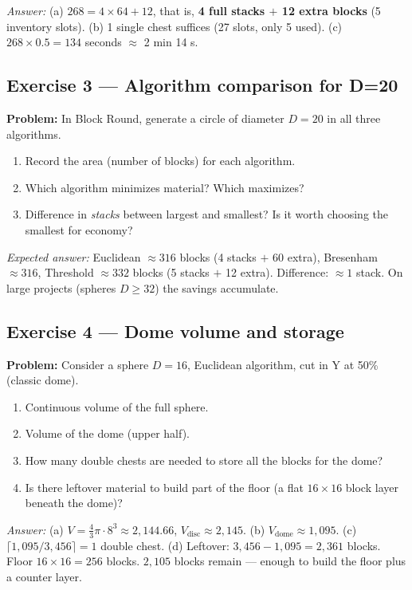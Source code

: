 \documentclass[12pt,a4paper]{scrartcl}
\newcommand{\acc}[1]{\textcolor{accent}{\textbf{#1}}}
\begin{document}
\emph{Answer:} (a) $268 = 4 \times 64 + 12$, that is, \acc{4 full stacks $+$ 12 extra blocks} (5 inventory slots). (b) 1 single chest suffices (27 slots, only 5 used). (c) $268 \times 0.5 = 134$ seconds $\approx$ 2 min 14 s.

\subsection*{Exercise 3 --- Algorithm comparison for D=20}
\textbf{Problem:} In Block Round, generate a circle of diameter $D = 20$ in all three algorithms.
\begin{enumerate}[label=\alph*),leftmargin=1.5em,itemsep=0.1em,topsep=0.2em,nosep]
  \item Record the area (number of blocks) for each algorithm.
  \item Which algorithm minimizes material? Which maximizes?
  \item Difference in \emph{stacks} between largest and smallest? Is it worth choosing the smallest for economy?
\end{enumerate}

\emph{Expected answer:} Euclidean $\approx 316$ blocks (4 stacks $+$ 60 extra), Bresenham $\approx 316$, Threshold $\approx 332$ blocks (5 stacks $+$ 12 extra). Difference: $\approx 1$ stack. On large projects (spheres $D \geq 32$) the savings accumulate.

\subsection*{Exercise 4 --- Dome volume and storage}
\textbf{Problem:} Consider a sphere $D = 16$, Euclidean algorithm, cut in Y at 50\% (classic dome).
\begin{enumerate}[label=\alph*),leftmargin=1.5em,itemsep=0.1em,topsep=0.2em,nosep]
  \item Continuous volume of the full sphere.
  \item Volume of the dome (upper half).
  \item How many double chests are needed to store all the blocks for the dome?
  \item Is there leftover material to build part of the floor (a flat $16 \times 16$ block layer beneath the dome)?
\end{enumerate}

\emph{Answer:}
(a) $V = \tfrac{4}{3}\pi \cdot 8^3 \approx 2{,}144.66$, $V_{\mathrm{disc}} \approx 2{,}145$. (b) $V_{\mathrm{dome}} \approx 1{,}095$. (c) $\lceil 1{,}095 / 3{,}456 \rceil = 1$ double chest. (d) Leftover: $3{,}456 - 1{,}095 = 2{,}361$ blocks. Floor $16 \times 16 = 256$ blocks. $2{,}105$ blocks remain --- enough to build the floor plus a counter layer.
\end{document}
